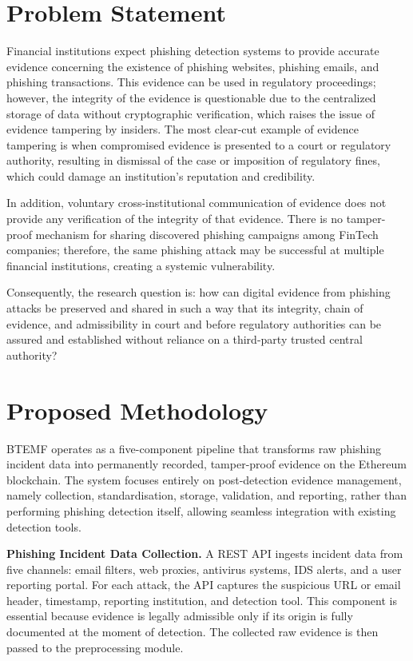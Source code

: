 \documentclass[conference]{IEEEtran}
\begin{document}
\section{Problem Statement}

Financial institutions expect phishing detection systems to provide accurate evidence concerning the existence of phishing websites, phishing emails, and phishing transactions. This evidence can be used in regulatory proceedings; however, the integrity of the evidence is questionable due to the centralized storage of data without cryptographic verification, which raises the issue of evidence tampering by insiders. The most clear-cut example of evidence tampering is when compromised evidence is presented to a court or regulatory authority, resulting in dismissal of the case or imposition of regulatory fines, which could damage an institution's reputation and credibility.

In addition, voluntary cross-institutional communication of evidence does not provide any verification of the integrity of that evidence. There is no tamper-proof mechanism for sharing discovered phishing campaigns among FinTech companies; therefore, the same phishing attack may be successful at multiple financial institutions, creating a systemic vulnerability.

Consequently, the research question is: how can digital evidence from phishing attacks be preserved and shared in such a way that its integrity, chain of evidence, and admissibility in court and before regulatory authorities can be assured and established without reliance on a third-party trusted central authority?

\section{Proposed Methodology}
\label{sec:methodology}

BTEMF operates as a five-component pipeline that transforms raw phishing incident data into permanently recorded, tamper-proof evidence on the Ethereum blockchain. The system focuses entirely on post-detection evidence management, namely collection, standardisation, storage, validation, and reporting, rather than performing phishing detection itself, allowing seamless integration with existing detection tools.

\textbf{Phishing Incident Data Collection.} A REST API ingests incident data from five channels: email filters, web proxies, antivirus systems, IDS alerts, and a user reporting portal. For each attack, the API captures the suspicious URL or email header, timestamp, reporting institution, and detection tool. This component is essential because evidence is legally admissible only if its origin is fully documented at the moment of detection. The collected raw evidence is then passed to the preprocessing module.
\end{document}
